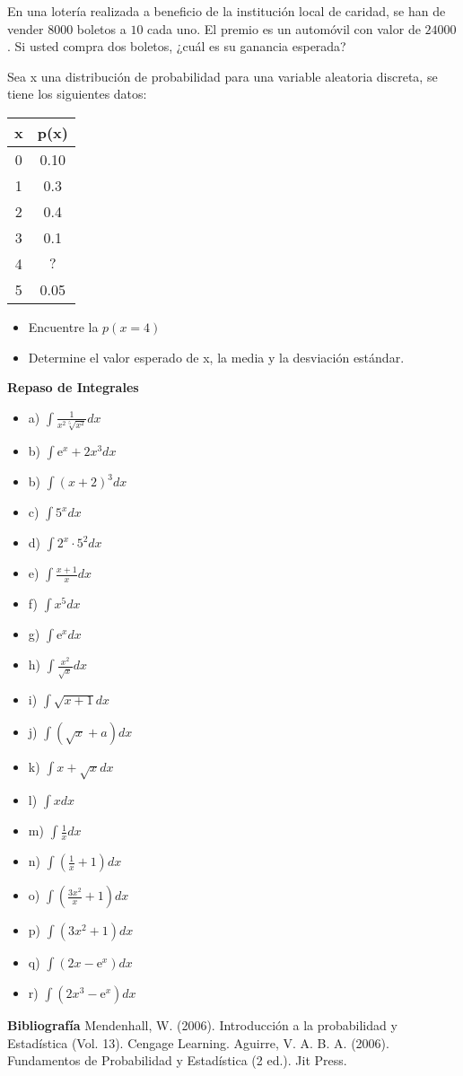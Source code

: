 \documentclass{../oxmathproblems}
\begin{document}
\begin{questions}
\miquestion En una lotería realizada a beneficio de la institución local de caridad, se han de vender 8000 boletos a $10$ cada uno. El premio es un automóvil con valor de $24 000$. Si usted compra dos boletos, ¿cuál es su ganancia esperada?

\miquestion Sea x una distribución de probabilidad para una variable aleatoria discreta, se tiene los siguientes datos: 
\begin{tabular}{| c | c |}
\hline
x & p(x) \\ \hline
0 & 0.10 \\ \hline
1 &  0.3 \\ \hline
2 & 0.4 \\ \hline
3 & 0.1 \\ \hline
4 & $?$ \\ \hline
5 & 0.05 \\ \hline
\end{tabular}
\begin{itemize}
\item Encuentre la $p(x=4)$
\item Determine el valor esperado de x, la media y la desviación estándar. 
\end{itemize}




\miquestion \textbf{Repaso de Integrales}
\begin{itemize}
\item a) $\int  \frac{1}{x^2 \sqrt[5]{x^2}} dx$ 
\item b) 
$\int \mathrm{e}^x+2x^3 dx $

\item b) $\int (x+2)^3 dx  $ 

\item c) $ \int 5^x dx  $ 
\item d) $ \int 2^x \cdot 5^2 dx $ 
\item e) $ \int \frac{x+1}{x} dx $ 
\item f) $ \int x^5 dx $ 
\item g) $ \int \mathrm{e}^x dx $ 
\item h) $ \int \frac{x^2}{\sqrt{x}} dx $ 
\item i) $ \int  \sqrt{x+1} dx $ 
\item j) $ \int  (\sqrt{x} + a) dx $ 
\item k) $ \int x + \sqrt{x} dx $ 
\item l) $ \int x  dx $ 
\item m) $ \int \frac{1}{x} dx  $
\item n) $ \int (\frac{1}{x} + 1) dx $
\item o) $ \int (\frac{3x^2}{x} + 1 ) dx $ 
\item p) $ \int (3x^2 + 1 ) dx $ 
\item q) $ \int (2x - \mathrm{e}^x ) dx $ 
\item r) $ \int (2x^3 - \mathrm{e}^x ) dx $ 
\end{itemize}



\end{questions}




\textbf{Bibliografía}
Mendenhall, W. (2006). Introducción a la probabilidad y Estadística (Vol. 13). Cengage Learning.
Aguirre, V. A. B. A. (2006). Fundamentos de Probabilidad y Estadística (2 ed.). Jit Press.
\end{document}
